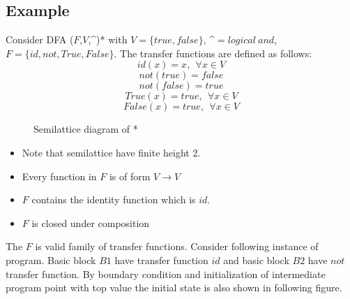 \subsection{Example}
Consider DFA ($F$,$V$,\^{})* with $V = \{true, false\}$, \^{}$= logical \ and $, $F = \{id,not,True,False\}$. The transfer functions are defined as follows:
\[id(x) = x, \ \ \forall x \in V \]
\[not(true) = false\]
\[not(false) = true\]
\[True(x) = true, \ \ \forall x \in V \]
\[False(x) = true, \ \ \forall x \in V \]
\begin{figure}[h!]
\caption{Semilattice diagram of *}
\begin{center}
\end{center}
\label{fig:semilattice_and}
\end{figure}
\begin{itemize}
    \item Note that semilattice have finite height 2.
    \item Every function in $F$ is of form $V \rightarrow V$
    \item $F$ contains the identity function which is $id$.
    \item $F$ is closed under composition
\end{itemize}
The $F$ is valid family of transfer functions. Consider following instance of program. Basic block $B1$ have transfer function $id$ and basic block $B2$ have $not$ transfer function. By boundary condition and initialization of intermediate program point with top value the initial state is also shown in following figure. 
